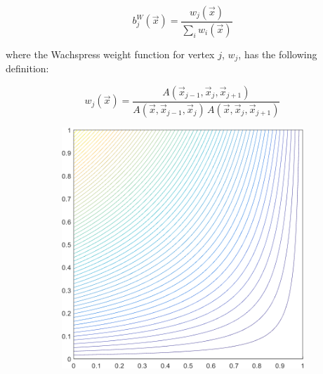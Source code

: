 \begin{equation}
\label{eq::BF_wach_BF}
b_{j}^{W} (\vec{x}) = \frac{w_j (\vec{x}) }{\sum_i w_i (\vec{x})}
\end{equation}

\noindent where the Wachspress weight function for vertex $j$, $w_j$, has the following definition:

\begin{equation}
\label{eq::BF_wach_weights}
w_j (\vec{x})  = \frac{A(\vec{x}_{j-1}, \vec{x}_{j}, \vec{x}_{j+1})}{A(\vec{x}, \vec{x}_{j-1}, \vec{x}_{j}) \, A(\vec{x}, \vec{x}_{j}, \vec{x}_{j+1})}
\end{equation}



\begin{figure}
\label{fig::2D_WACHSPRESS1_unit_square_basis_functions}
\centering
	\begin{subfigure}[b]{0.39\textwidth}
		\centering
		\includegraphics[width=\textwidth]{figures/sec_BF/square_WACHSPRESS1_contour_b4.png}
		\caption{}
	\end{subfigure}
	\hspace{1.5cm}
	\begin{subfigure}[b]{0.39\textwidth}
		\centering

\end{subfigure}
\end{figure}

